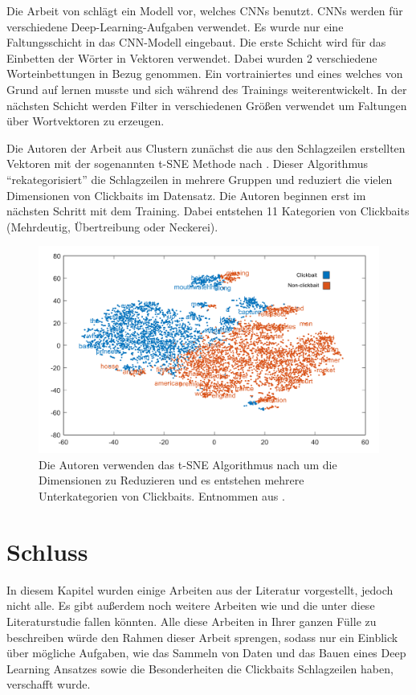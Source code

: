 Die Arbeit von \cite*{Agrawal2017} schlägt ein Modell vor, welches CNNs benutzt. CNNs werden für verschiedene Deep-Learning-Aufgaben verwendet. Es wurde nur eine Faltungsschicht in das CNN-Modell eingebaut. Die erste Schicht wird für das Einbetten der Wörter in Vektoren verwendet. Dabei wurden 2 verschiedene Worteinbettungen in Bezug genommen. Ein vortrainiertes und eines welches von Grund auf lernen musste und sich während des Trainings weiterentwickelt. In der nächsten Schicht werden Filter in verschiedenen Größen verwendet um Faltungen über Wortvektoren zu erzeugen.

Die Autoren der Arbeit aus \cite*{Pujahari} Clustern zunächst die aus den Schlagzeilen erstellten Vektoren mit der sogenannten t-SNE Methode nach \cite{VanDerMaaten2008}. Dieser Algorithmus \enquote{rekategorisiert} die Schlagzeilen in mehrere Gruppen und reduziert die vielen Dimensionen von Clickbaits im Datensatz. Die Autoren beginnen erst im nächsten Schritt mit dem Training. Dabei entstehen 11 Kategorien von Clickbaits (Mehrdeutig, Übertreibung oder Neckerei).


\begin{figure}[H]
    \centering
    \includegraphics[width=12cm]{kapitel4/tsne.png}
    \caption[Clustering von Überschriften mit t-SNE]{Die Autoren verwenden das t-SNE Algorithmus nach \cite{VanDerMaaten2008} um die Dimensionen zu Reduzieren und es entstehen mehrere Unterkategorien von Clickbaits. Entnommen aus \cite*{Pujahari}.}
    \label{TSNE}
\end{figure}

\section{Schluss}
In diesem Kapitel wurden einige Arbeiten aus der Literatur vorgestellt, jedoch nicht alle. Es gibt außerdem noch weitere Arbeiten wie \cite*{chawda2019novel}\cite*{Zannettou2018}\cite*{Kumar}\cite*{Thomas}\cite*{Liao}\cite*{Glenski} und \cite*{Biyani2016} die unter diese Literaturstudie fallen könnten. Alle diese Arbeiten in Ihrer ganzen Fülle zu beschreiben würde den Rahmen dieser Arbeit sprengen, sodass nur ein Einblick über mögliche Aufgaben, wie das Sammeln von Daten und das Bauen eines Deep Learning Ansatzes sowie die Besonderheiten die Clickbaits Schlagzeilen haben, verschafft wurde.
